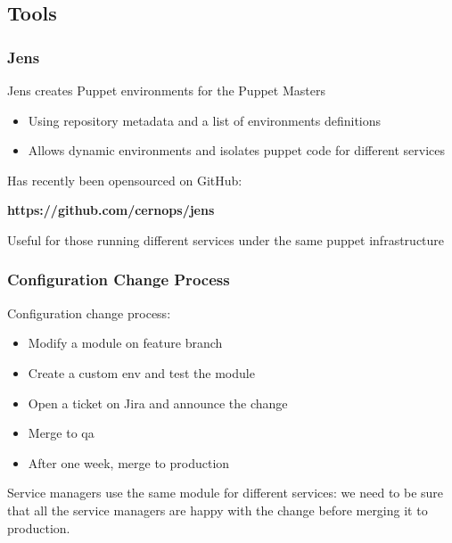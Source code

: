 \documentclass[aspectratio=169]{beamer}
\begin{document}

\subsection{Tools}
\begin{frame}
    \frametitle{Jens}
    Jens creates Puppet environments for the Puppet Masters
    \begin{itemize}
        \item Using repository metadata and a list of environments definitions
        \item Allows dynamic environments and isolates puppet code
            for different services
    \end{itemize}
    \vspace{2em}
    Has recently been opensourced on GitHub: \\
    \vspace{1em}
    \begin{center}
        \textbf{https://github.com/cernops/jens} \\
    \end{center}
    \vspace{1em}
    Useful for those running different services under the
    same puppet infrastructure
\end{frame}


\begin{frame}
    \frametitle{Configuration Change Process}
    Configuration change process:
    \begin{itemize}
        \item Modify a module on feature branch
        \item Create a custom env and test the module
        \item Open a ticket on Jira and announce the change
        \item Merge to qa
        \item After one week, merge to production
    \end{itemize}

    Service managers use the same module for different services: we need to
    be sure that all the service managers are happy with the change before
    merging it to production.

\end{frame}

\end{document}
